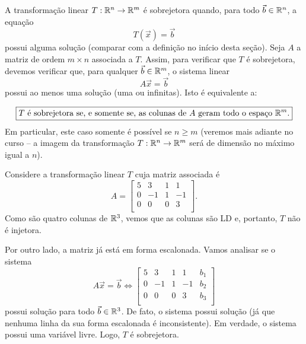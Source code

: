 \documentclass[../livro.tex]{subfiles}
\begin{document}
A transformação linear $T: \mathbb{R}^n \to \mathbb{R}^m$ é sobrejetora quando, para todo $\vec{b} \in \mathbb{R}^n$, a equação
\begin{equation}
T(\vec{x}) = \vec{b}
\end{equation} possui alguma solução (comparar com a definição no início desta seção). Seja $A$ a matriz de ordem $m\times n$ associada a $T$. Assim, para verificar que $T$ é sobrejetora, devemos verificar que, para qualquer $\vec{b} \in \mathbb{R}^m$, o sistema linear
\begin{equation}
A\vec{x} = \vec{b}
\end{equation} possui ao menos uma solução (uma ou infinitas). Isto é equivalente a:


\begin{equation}
\boxed{\text{$T$ é sobrejetora se, e somente se, as colunas de $A$ geram todo o espaço $\mathbb{R}^m$.}}
\end{equation} Em particular, este caso somente é possível se $n \ge m$ (veremos mais adiante no curso -- a imagem da transformação $T: \mathbb{R}^n \to \mathbb{R}^m$ será de dimensão no máximo igual a $n$).


\begin{example}\label{exp:injsob1}
Considere a transformação linear $T$ cuja matriz associada é
\begin{equation}
A = \left[
  \begin{array}{rrrr}
    5  & 3 & 1 & 1 \\
    0  & -1 & 1 & -1 \\
    0  & 0 & 0 & 3 \\
  \end{array}
\right].
\end{equation} Como são quatro colunas de $\mathbb{R}^3$, vemos que as colunas são LD e, portanto, $T$ não é injetora.

Por outro lado, a matriz já está em forma escalonada. Vamos analisar se o sistema
\begin{equation}
A \vec{x} = \vec{b} \iff
\left[
  \begin{array}{rrrr|r}
    5  & 3 & 1 & 1 & b_1\\
    0  & -1 & 1 & -1& b_2\\
    0  & 0 & 0 & 3& b_3\\
  \end{array}
\right]
\end{equation} possui solução para todo $\vec{b} \in \mathbb{R}^3$. De fato, o sistema possui solução (já que nenhuma linha da sua forma escalonada é inconsistente). Em verdade, o sistema possui uma variável livre. Logo, $T$ é sobrejetora.
\end{example}
\end{document}
